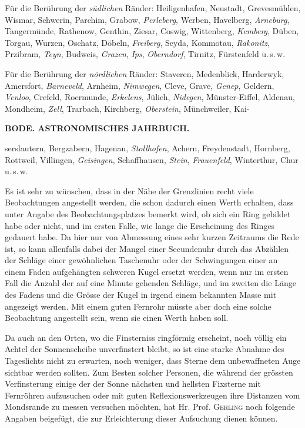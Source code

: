 Für die Berührung der \emph{südlichen} Ränder: Heiligenhafen, Neustadt, Grevesmühlen, Wismar, Schwerin, Parchim, Grabow, \emph{Perleberg}, Werben, Havelberg, \emph{Arneburg}, Tangermünde, Rathenow, Genthin, Ziesar, Coswig, Wittenberg, \emph{Kemberg}, Düben, Torgau, Wurzen, Oschatz, Döbeln, \emph{Freiberg}, Seyda, Kommotau, \emph{Rakonitz}, Przibram, \emph{Teyn}, Budweis, \emph{Grazen}, \emph{Ips}, \emph{Oberndorf}, Tirnitz, Fürstenfeld u.\,s.\,w.

Für die Berührung der \emph{nördlichen} Ränder: Staveren, Medenblick, Harderwyk, Amersfort, \emph{Barneveld}, Arnheim, \emph{Nimwegen}, Cleve, Grave, \emph{Genep}, Geldern, \emph{Venloo}, Crefeld, Roermunde, \emph{Erkelens}, Jülich, \emph{Nidegen}, Münster-Eiffel, Aldenau, Mondheim, \emph{Zell}, Trarbach, Kirchberg, \emph{Oberstein}, Münchweiler, Kai-\par
\clearpage
{}
\noindent\makebox[10mm][l]{}%
\parbox[b]{\dimexpr\textwidth-20mm\relax}{\centering\small\textbf{BODE. ASTRONOMISCHES JAHRBUCH.}}%
\par\nobreak\medskip
\noindent serslautern, Bergzabern, Hagenau, \emph{Stollhofen}, Achern, Freydenstadt, Hornberg, Rottweil, Villingen, \emph{Geisingen}, Schaffhausen, \emph{Stein}, \emph{Frauenfeld}, Winterthur, Chur u.\,s.\,w.

Es ist sehr zu wünschen, dass in der Nähe der Grenzlinien recht viele Beobachtungen angestellt werden, die schon dadurch einen Werth erhalten, dass unter Angabe des Beobachtungsplatzes bemerkt wird, ob sich ein Ring gebildet habe oder nicht, und im ersten Falle, wie lange die Erscheinung des Ringes gedauert habe. Da hier nur von Abmessung eines sehr kurzen Zeitraums die Rede ist, so kann allenfalls dabei der Mangel einer Secundenuhr durch das Abzählen der Schläge einer gewöhnlichen Taschenuhr oder der Schwingungen einer an einem Faden aufgehängten schweren Kugel ersetzt werden, wenn nur im ersten Fall die Anzahl der auf eine Minute gehenden Schläge, und im zweiten die Länge des Fadens und die Grösse der Kugel in irgend einem bekannten Masse mit angezeigt werden. Mit einem guten Fernrohr müsste aber doch eine solche Beobachtung angestellt sein, wenn sie einen Werth haben soll.

Da auch an den Orten, wo die Finsterniss ringförmig erscheint, noch völlig ein Achtel der Sonnenscheibe unverfinstert bleibt, so ist eine starke Abnahme des Tageslichts nicht zu erwarten, noch weniger, dass Sterne dem unbewaffneten Auge sichtbar werden sollten. Zum Besten solcher Personen, die während der grössten Verfinsterung einige der der Sonne nächsten und hellsten Fixsterne mit Fernröhren aufzusuchen oder mit guten Reflexionswerkzeugen ihre Distanzen vom Mondsrande zu messen versuchen möchten, hat Hr. Prof. \textsc{Gerling} noch folgende Angaben beigefügt, die zur Erleichterung dieser Aufsuchung dienen können.

